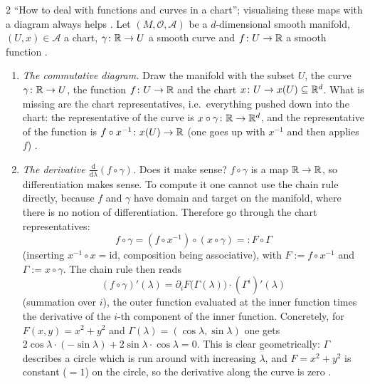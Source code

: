 \begin{paracol}{2}
``How to deal with functions and curves in a chart''; visualising these maps with a diagram always helps . Let $(M,\mathcal O,\mathcal A)$ be a $d$-dimensional smooth manifold, $(U,x)\in\mathcal A$ a chart, $\gamma\colon\mathbb{R}\to U$ a smooth curve and $f\colon U\to\mathbb{R}$ a smooth function
.
\begin{enumerate}
  \item \emph{The commutative diagram.} Draw the manifold with the subset $U$, the curve $\gamma\colon\mathbb{R}\to U$, the function $f\colon U\to\mathbb{R}$ and the chart $x\colon U\to x(U)\subseteq\mathbb{R}^d$. What is missing are the chart representatives, i.e.\ everything pushed down into the chart: the representative of the curve is $x\circ\gamma\colon\mathbb{R}\to\mathbb{R}^d$, and the representative of the function
        is $f\circ x^{-1}\colon x(U)\to\mathbb{R}$ (one goes up with $x^{-1}$ and then applies $f$) .
  \item \emph{The derivative $\frac{\mathrm d}{\mathrm d\lambda}(f\circ\gamma)$.} Does it make sense? $f\circ\gamma$ is a map $\mathbb{R}\to\mathbb{R}$, so differentiation makes sense. To compute it one cannot use the chain rule directly, because $f$ and $\gamma$ have domain and target on the manifold, where there is no notion of differentiation. Therefore go through the chart representatives:
        \[
          f\circ\gamma=(f\circ x^{-1})\circ(x\circ\gamma)=:F\circ\Gamma
        \]
        (inserting $x^{-1}\circ x=\mathrm{id}$, composition being associative), with $F:=f\circ x^{-1}$ and $\Gamma:=x\circ\gamma$. The chain rule then reads
        \[
          (f\circ\gamma)'(\lambda)=\partial_iF\bigl(\Gamma(\lambda)\bigr)\cdot(\Gamma^i)'(\lambda)
        \]
        (summation over $i$), the outer function evaluated at the inner function times the derivative of the $i$-th component of the inner function.
        Concretely, for $F(x,y)=x^2+y^2$ and $\Gamma(\lambda)=(\cos\lambda,\sin\lambda)$ one gets $2\cos\lambda\cdot(-\sin\lambda)+2\sin\lambda\cdot\cos\lambda=0$.
        This is clear geometrically: $\Gamma$ describes a circle which is run around with increasing $\lambda$, and $F=x^2+y^2$ is constant ($=1$) on the circle, so the derivative along the curve is zero
        .
\end{enumerate}


\end{paracol}
